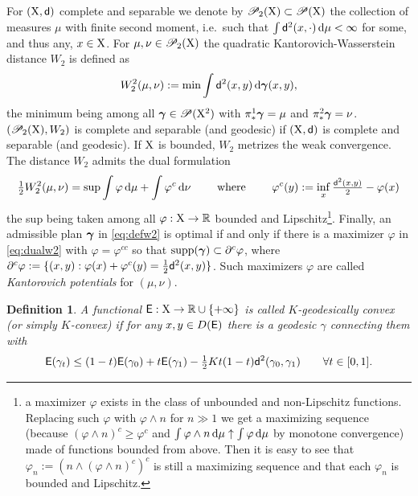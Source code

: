 \documentclass[11pt]{article}
\numberwithin{equation}{section}
\newtheorem{definition}[theorem]{Definition}
\newcommand{\R}{\mathbb{R}}
\newcommand{\ggamma}{{\mbox{\boldmath$\gamma$}}}
\newcommand{\pr}{\mathscr P}
\newcommand{\prd}{\mathscr P_2}
\newcommand{\X}{{\rm X}}
\newcommand{\sfd}{{\sf d}}
\renewcommand{\d}{{\rm d}}
\newcommand{\supp}{{\rm supp}}
\newcommand{\E}{{\sf E}} %
\begin{document}
For $(\X,\sfd)$ complete and separable we denote by $\prd(\X)\subset\pr(\X)$ the collection of measures $\mu$ with finite second moment, i.e.\ such that $\int\sfd^2(x,\cdot)\,\d\mu<\infty$ for some, and thus any, $x\in\X$. For $\mu,\nu\in\prd(\X)$ the quadratic Kantorovich-Wasserstein distance $W_2$ is defined as
\begin{equation}
\label{eq:defw2}
W_2^2(\mu,\nu):=\min\int \sfd^2(x,y)\,\d\ggamma(x,y),
\end{equation}
the minimum being among all $\ggamma\in\pr(\X^2)$ with $\pi^1_*\ggamma=\mu$ and $\pi^2_*\ggamma=\nu$. $(\prd(\X),W_2)$ is complete and separable (and geodesic) if $(\X,\sfd)$ is complete and separable (and geodesic). If $\X$ is bounded, $W_2$ metrizes the weak convergence.  The distance $W_2$ admits the  dual formulation
\begin{equation}
\label{eq:dualw2}
\tfrac12W_2^2(\mu,\nu)=\sup\int\varphi\,\d\mu+\int\varphi^c\,\d\nu\qquad\text{ where }\qquad \varphi^c(y):=\inf_{x}\tfrac{\sfd^2(x,y)}2-\varphi(x)
\end{equation}
the sup being taken among all $\varphi:\X\to\R$ bounded and Lipschitz\footnote{a maximizer $\varphi$ exists in the class of unbounded and non-Lipschitz functions. Replacing such $\varphi$ with $\varphi\wedge n$ for $n\gg1$ we get a maximizing sequence (because $(\varphi\wedge n)^c\geq\varphi^ c$ and $\int \varphi\wedge n\,\d\mu\uparrow\int \varphi\,\d\mu$ by monotone convergence) made of functions bounded from above. Then it is easy to see that $\varphi_n:=(n\wedge (\varphi\wedge n)^c)^c$ is still a maximizing sequence and that each $\varphi_n$ is bounded and Lipschitz.}. Finally, an admissible plan $\ggamma$ in \eqref{eq:defw2} is optimal if and only if there is a maximizer $\varphi$ in \eqref{eq:dualw2} with $\varphi=\varphi^{cc}$ so that $\supp(\ggamma)\subset\partial^c\varphi$, where $\partial^c\varphi:=\{(x,y):\varphi(x)+\varphi^c(y)=\tfrac12\sfd^2(x,y)\}$. Such maximizers $\varphi$ are called \emph{Kantorovich potentials} for $(\mu,\nu)$.
\begin{definition}\label{def:cdki}
A functional $\E:\X\to\R\cup\{+\infty\}$ is called $K$-geodesically convex (or simply $K$-convex) if for any $x,y\in D(\E)$ there is a geodesic $\gamma$ connecting them with 
\begin{equation}
\label{eq:defkconv}
\E(\gamma_t)\leq(1-t)\E(\gamma_0)+t\E(\gamma_1)-\tfrac12Kt(1-t)\sfd^2(\gamma_0,\gamma_1)\qquad\forall t\in[0,1].
\end{equation}
\end{definition}
\end{document}
